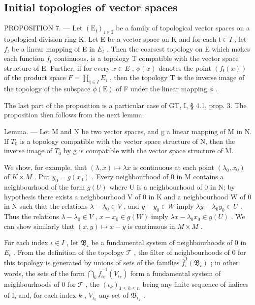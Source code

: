 \subsection{Initial topologies of vector spaces}

PROPOSITION 7. --- Let \((\mathrm{E}_{\mathfrak{t}})_{\mathfrak{t}\in\mathbf{I}}\) be a family of topological vector spaces on a topological division ring K. Let E be a vector space on K and for each \(\mathfrak{t}\in I\) , let \(f_{t}\) be a linear mapping of E in \(E_{t}\) . Then the coarsest topology on E which makes each function \(f_{t}\) continuous, is a topology T compatible with the vector space structure of E. Further, if for every \(x\in E\) , \(\phi(x)\) denotes the point \((f_{\mathfrak{t}}(x))\) of the product space \(F=\prod_{\mathfrak{t}\in I}E_{\mathfrak{t}}\) , then the topology T is the inverse image of the topology of the subspace \(\phi(\mathrm{E})\) of F under the linear mapping \(\phi\) .

The last part of the proposition is a particular case of GT, I, § 4.1, prop. 3. The proposition then follows from the next lemma.

Lemma. --- Let M and N be two vector spaces, and g a linear mapping of M in N. If \(T_{0}\) is a topology compatible with the vector space structure of N, then the inverse image of \(T_{0}\) by g is compatible with the vector space structure of M.

We show, for example, that \((\lambda, x) \mapsto \lambda x\) is continuous at each point \((\lambda_{0}, x_{0})\) of \(K \times M\) . Put \(y_{0} = g(x_{0})\) . Every neighbourhood of 0 in M contains a neighbourhood of the form \(g(U)\) where U is a neighbourhood of 0 in N; by hypothesis there exists a neighbourhood V of 0 in K and a neighbourhood W of 0 in N such that the relations \(\lambda - \lambda_{0} \in V\) , and \(y - y_{0} \in W\) imply \(\lambda y - \lambda_{0}y_{0} \in U\) . Thus the relations \(\lambda - \lambda_{0} \in V\) , \(x - x_{0} \in g(W)\) imply \(\lambda x - \lambda_{0}x_{0} \in g(U)\) . We can show similarly that \((x, y) \mapsto x - y\) is continuous in \(M \times M\) .

For each index \(\iota \in I\) , let \(\mathfrak{B}_{\iota}\) be a fundamental system of neighbourhoods of 0 in \(E_{\iota}\) . From the definition of the topology \(\mathcal{T}\) , the filter of neighbourhoods of 0 for this topology is generated by unions of sets of the families \(\overline{f}_{\iota}^{1}(\mathfrak{B}_{\iota})\) ; in other words, the sets of the form \(\bigcap_{k} \overline{f}_{\iota_k}^{-1}(V_{\iota_k})\) form a fundamental system of neighbourhoods of 0 for \(\mathcal{T}\) , the \((\iota_k)_{1 \leqslant k \leqslant n}\) being any finite sequence of indices of I, and, for each index \(k\) , \(V_{\iota_k}\) any set of \(\mathfrak{B}_{\iota_k}\) .

